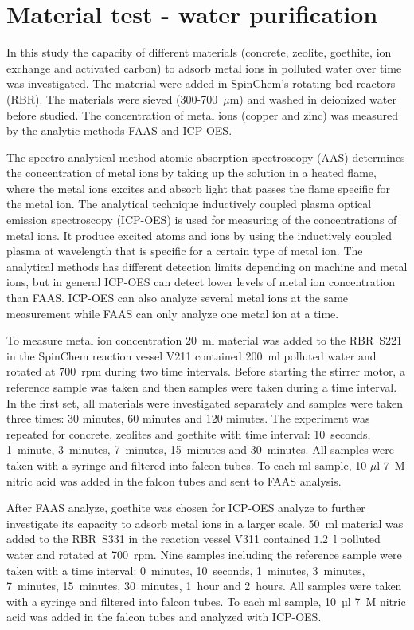 \section{Material test - water purification}
In this study the capacity of different materials (concrete, zeolite, goethite,
ion exchange and activated carbon) to adsorb metal ions in polluted water over
time was investigated. The material were added in SpinChem's rotating
bed reactors (RBR). The materials were sieved (300-700~$\mu$m) and washed in
deionized water before studied. The concentration of metal ions (copper and
zinc) was measured by the analytic methods FAAS and ICP-OES.

The spectro analytical method atomic absorption spectroscopy (AAS) determines the concentration of metal ions by taking up the solution in a heated flame, where the metal ions excites and absorb light that passes the flame specific for the metal ion.\cite{ford} The analytical technique inductively coupled plasma optical emission spectroscopy (ICP-OES) is used for measuring of the concentrations of metal ions. It produce excited atoms and ions by using the inductively coupled plasma at wavelength that is specific for a certain type of metal ion. The analytical methods has different detection limits depending on machine and metal ions, but in general ICP-OES can detect lower levels of metal ion concentration than FAAS. ICP-OES can also analyze several metal ions at the same measurement while FAAS can only analyze one metal ion at a time\cite{boss}\cite{fassel}. 

To measure metal ion concentration 20~ml material was added to the RBR~S221 in the SpinChem reaction vessel V211 contained 200~ml polluted water and rotated at 700~rpm during two time intervals. Before starting the stirrer motor, a reference sample was taken and then samples were taken during a time interval. In the first set, all materials were investigated separately and samples were taken three times: 30 minutes, 60 minutes and 120 minutes. The experiment was repeated for concrete, zeolites and goethite with time interval: 10~seconds, 1~minute, 3~minutes, 7~minutes, 15~minutes and 30~minutes. All samples were taken with a syringe and filtered into falcon tubes. To each ml sample, 10 $\mu$l 7~M nitric acid was added in the falcon tubes and sent to FAAS analysis. 

After FAAS analyze, goethite was chosen for ICP-OES analyze to further investigate its capacity to adsorb metal ions in a larger scale. 50~ml material was added to the RBR~S331 in the reaction vessel V311 contained $1.2$~l polluted water and rotated at 700~rpm. Nine samples including the reference sample were taken with a time interval: 0~minutes, 10~seconds, 1~minutes, 3~minutes, 7~minutes, 15~minutes, 30~minutes, 1~hour and 2~hours. All samples were taken with a syringe and filtered into falcon tubes. To each ml sample, 10~µl 7~M nitric acid was added in the falcon tubes and analyzed with ICP-OES. 

